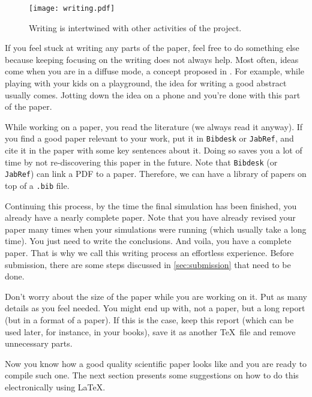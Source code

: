 \documentclass[authoryear,12pta4paper,fleqn]{article}
\numberwithin{equation}{section}
\theoremstyle{remark}
\begin{document}

 \begin{figure}[!ht]
      \centering
      \texttt{[image: writing.pdf]}
      \caption{Writing is intertwined with other activities of the project.}
      \label{fig:writing}
    \end{figure}

If you feel stuck at writing any parts of the paper, feel free to do something else because keeping focusing on the writing does not always help. Most often, ideas come when you are in a diffuse mode, a concept proposed in \cite{Oakley:2018a}. For example, while playing with your kids on a playground, the idea for writing a good abstract usually comes. Jotting down the idea on a phone and you're done with this part of the paper.

While working on a paper, you read the literature (we always read it anyway). If you find a good paper relevant to your work, put it in \texttt{Bibdesk} or \texttt{JabRef}, and cite it in the paper with some key sentences about it. Doing so saves you a lot of time by not re-discovering this paper in the future. Note that \texttt{Bibdesk} (or \texttt{JabRef}) can link a PDF to a paper. Therefore, we can have a library of papers on top of a \texttt{.bib} file. 

Continuing this process, by the time the final simulation has been finished, you already have a nearly complete paper. Note that you have already revised your paper many times when your simulations were running (which usually take a long time).
You just need to write the conclusions. And voila, you have a complete paper. That is why we call this writing process an effortless experience.
Before submission, there are some steps discussed in \cref{sec:submission} that need to be done.

Don't worry about the size of the paper while you are working on it. Put as many details as you feel needed. You might end up with, not a paper, but a long report (but in a format of a paper). If this is the case, keep this report (which can be used later, for instance, in your books), save it as another \TeX\ file and remove unnecessary parts.

Now you know how a good quality scientific paper looks like and you are ready to compile such one. The next section presents some suggestions on how to do this electronically using \LaTeX. \\
\end{document}
